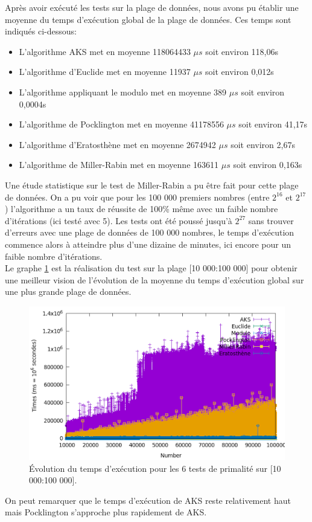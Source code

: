 Après avoir exécuté les tests sur la plage de données, nous avons pu établir une moyenne du temps d'exécution global de la plage de données. Ces temps sont indiqués ci-dessous:
\begin{itemize}
	\item L'algorithme AKS met en moyenne 118064433 $\mu s$ soit environ 118,06s
	\item L'algorithme d'Euclide met en moyenne 11937 $\mu s$ soit environ 0,012s
	\item L'algorithme appliquant le modulo met en moyenne 389 $\mu s$ soit environ 0,0004s
	\item L'algorithme de Pocklington met en moyenne 41178556 $\mu s$ soit environ 41,17s
	\item L'algorithme d'Eratosthène met en moyenne 2674942 $\mu s$ soit environ 2,67s
	\item L'algorithme de Miller-Rabin met en moyenne 163611 $\mu s$ soit environ 0,163s
\end{itemize}

 Une étude statistique sur le test de Miller-Rabin a pu être fait pour cette plage de données. On a pu voir que pour les 100 000 premiers nombres (entre $2^{16}$ et $2^{17}$) l’algorithme a un taux de réussite de 100\% même avec un faible nombre d’itérations (ici testé avec 5). Les tests ont été poussé jusqu’à $2^{27}$ sans trouver d’erreurs avec une plage de données de 100 000 nombres, le temps d’exécution commence alors à atteindre plus d’une dizaine de minutes, ici encore pour un faible nombre d’itérations.\\
 
 Le graphe \ref{fg:fig9} est la réalisation du test sur la plage [10 000:100 000] pour obtenir une meilleur vision de l'évolution de la moyenne du temps d'exécution global sur une plus grande plage de données.
 \begin{figure}[!ht]
 		\begin{center}\includegraphics[scale=0.5]{RANGE2.png}\end{center}
		\caption{Évolution du temps d'exécution pour les 6 tests de primalité sur [10 000:100 000]. }
		\label{fg:fig9}
	\end{figure}
	On peut remarquer que le temps d’exécution de AKS reste relativement haut mais Pocklington s'approche plus rapidement de AKS.
 
